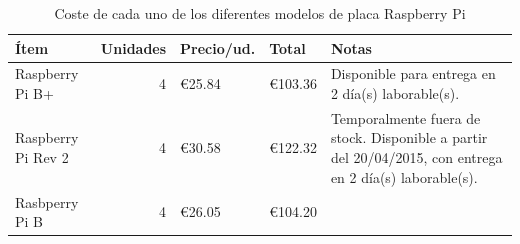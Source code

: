 \begin{table}[H]
\begin{tabular}{|l|r|l|l|p{4.5cm}|}
\hline
\textbf{Ítem}&\textbf{Unidades}&\textbf{Precio}/ud.&\textbf{Total}&\textbf{Notas}\\
\hline
Raspberry Pi B+&4&€25.84&€103.36&Disponible para entrega en 2 día(s) laborable(s).\\%
\hline
Raspberry Pi Rev 2&4&€30.58&€122.32&Temporalmente fuera de stock. Disponible a partir del 20/04/2015, con entrega en 2 día(s) laborable(s).\\%
\hline
Rasbperry Pi B&4&€26.05&€104.20&\\%
\hline
\end{tabular}
\caption{Coste de cada uno de los diferentes modelos de placa Raspberry Pi}
\end{table}

